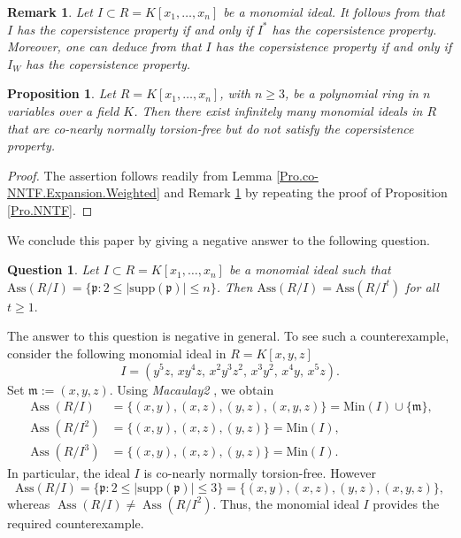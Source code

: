 \documentclass[11pt]{amsart}
\newtheorem{question}[theorem]{Question}
\newtheorem{proposition}[theorem]{Proposition}
\newtheorem{remark}[theorem]{Remark}
\begin{document}
  \begin{remark}\label{Rem.CONNTF}
  {\em
 Let $I\subset R=K[x_1, \ldots, x_n]$ be a monomial ideal. It follows from \cite[Theorem 3.10]{NT.3} that  $I$ has the copersistence property if and only if $I^*$  has the copersistence property. Moreover,  one can deduce from \cite[Theorem 3.14]{NT.3} that  $I$ has the copersistence property if and only if $I_W$   has the copersistence property. 
 }
 \end{remark}
      
   
   \begin{proposition} \label{Pro.co-NNTF}
 Let $R=K[x_1,\ldots,x_n]$, with $n\geq 3$, be a polynomial ring in
$n$ variables over a field $K$. Then there exist infinitely many monomial
ideals in $R$ that are co-nearly normally torsion-free but do not satisfy the
copersistence property.
 \end{proposition}
  
  \begin{proof}
  The assertion follows readily  from Lemma \ref{Pro.co-NNTF.Expansion.Weighted} and Remark \ref{Rem.CONNTF}
   by repeating the proof of Proposition \ref{Pro.NNTF}. 
  \end{proof}
  
  
  \bigskip
  We conclude this paper by giving a negative answer to the following question.
 
 
 \begin{question}  
Let $I\subset R=K[x_1, \ldots, x_n]$ be a monomial ideal such that 
 $\mathrm{Ass}(R/I)=\{\mathfrak{p} :  2\leq |\mathrm{supp}(\mathfrak{p})| \leq n\}$. Then  
$\mathrm{Ass}(R/I) = \mathrm{Ass}(R/I^t)$ for all  $t\geq 1.$
\end{question}

The answer to this question is negative in general. To see such a counterexample, consider the following monomial ideal in $R=K[x,y,z]$
$$I =(y^5z,\,xy^4z,\,x^2y^3z^2,\,x^3y^2,\,x^4y,\,x^5z).$$
 Set $\mathfrak{m}:=(x,y,z)$.  Using  \textit{Macaulay2} \cite{GS}, we obtain 
 \[
\begin{aligned}
\operatorname{Ass}(R/I)&=\{(x,y),(x,z), (y,z), (x,y,z)\}=\mathrm{Min}(I)\cup \{\mathfrak{m}\},\\
\operatorname{Ass}(R/I^2)&=\{(x,y),(x,z), (y,z)\}=\mathrm{Min}(I),\\
\operatorname{Ass}(R/I^3)&=\{(x,y),(x,z), (y,z)\}=\mathrm{Min}(I).
\end{aligned}
\]
In particular, the ideal $I$  is co-nearly normally torsion-free. However
 $$\mathrm{Ass}(R/I)=\{\mathfrak{p} :  2\leq |\mathrm{supp}(\mathfrak{p})| \leq 3\}=\{(x,y),(x,z), (y,z), (x,y,z)\},$$ whereas
$\operatorname{Ass}(R/I) \neq \operatorname{Ass}(R/I^2)$.  Thus, the monomial ideal  $I$ provides the required counterexample. 
\end{document}
